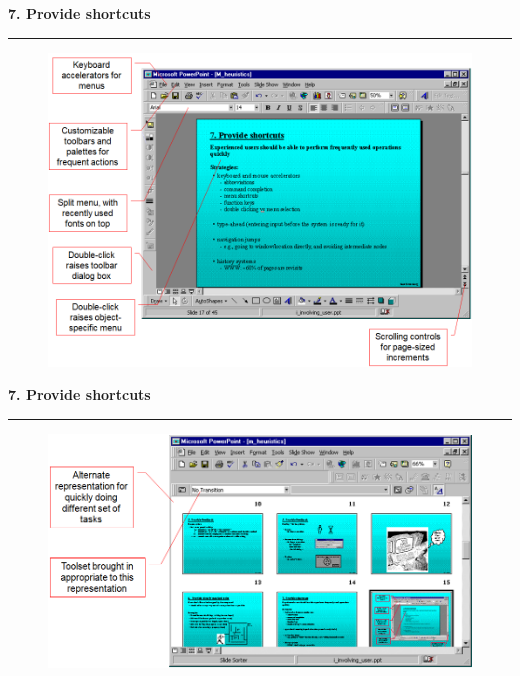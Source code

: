 \documentclass[pdf]{beamer}
\begin{document}
\begin{frame}
{\textbf{7. Provide shortcuts}}{\textcolor{red}{\rule{12cm}{1.2pt}}}

\begin{figure}
\includegraphics[scale=0.4]{33_picture.png}
\end{figure}

\end{frame}



\begin{frame}
{\textbf{7. Provide shortcuts}}{\textcolor{red}{\rule{12cm}{1.2pt}}}

\vspace{-0.5cm}

\begin{figure}
\includegraphics[scale=0.4]{34_picture.png}
\end{figure}

\end{frame}
\end{document}
